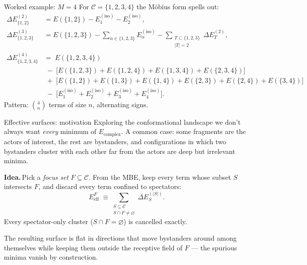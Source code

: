 \documentclass[aspectratio=169,11pt]{beamer}
\newcommand{\Eiso}{E^{(\mathrm{iso})}}
\newcommand{\Ecpl}{E_{\mathrm{complex}}}
\begin{document}
\begin{frame}{Worked example: $M=4$}
For $\mathcal{C}=\{1,2,3,4\}$ the Möbius form spells out:
{\small
\begin{align*}
\Delta E^{(2)}_{\{1,2\}} &= E(\{1,2\}) - \Eiso_1 - \Eiso_2,\\[2pt]
\Delta E^{(3)}_{\{1,2,3\}} &= E(\{1,2,3\})
  -\!\!\sum_{\alpha\in\{1,2,3\}}\!\!\Eiso_\alpha
  -\!\!\!\!\sum_{\substack{T\subset\{1,2,3\}\\|T|=2}}\!\!\!\!\Delta E^{(2)}_T,\\[2pt]
\Delta E^{(4)}_{\{1,2,3,4\}}
 &=\;E(\{1,2,3,4\})\\
 &\;-\;\big[E(\{1,2,3\})+E(\{1,2,4\})+E(\{1,3,4\})+E(\{2,3,4\})\big]\\
 &\;+\;\big[E(\{1,2\})+E(\{1,3\})+E(\{1,4\})+E(\{2,3\})+E(\{2,4\})+E(\{3,4\})\big]\\
 &\;-\;\big[\Eiso_1+\Eiso_2+\Eiso_3+\Eiso_4\big].
\end{align*}}%
Pattern: $\binom{4}{n}$ terms of size $n$, alternating signs.
\end{frame}

\begin{frame}{Effective surfaces: motivation}
\small
Exploring the conformational landscape we don't always want
\emph{every} minimum of $\Ecpl$. A common case: some fragments are the actors
of interest, the rest are bystanders, and configurations in which two
bystanders cluster with each other far from the actors are deep but
irrelevant minima.

\medskip
\textbf{Idea.}\,Pick a \emph{focus set} $F\subseteq\mathcal{C}$. From the MBE,
keep every term whose subset $S$ intersects $F$, and discard every term
confined to spectators:
\[
E_{\mathrm{eff}}^{F}
\;\equiv\!\!\!\!\sum_{\substack{S\subseteq\mathcal{C}\\ S\cap F\ne\varnothing}}
\!\!\!\!\Delta E^{(|S|)}_S.
\]
Every spectator-only cluster ($S\cap F=\varnothing$) is cancelled exactly.

\medskip
The resulting surface is flat in directions that move bystanders around among
themselves while keeping them outside the receptive field of $F$ — the
spurious minima vanish by construction.
\end{frame}
\end{document}
